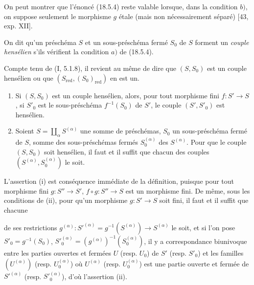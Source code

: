 \begin{remark}[18.5.4.4]
\label{IV.18.5.4.4}
On peut montrer que l'énoncé (18.5.4) reste valable lorsque, dans la condition $b)$, on suppose seulement le morphisme $g$ étale (mais non nécessairement séparé) [43, exp. XII].
\end{remark}

\begin{definition}[18.5.5]
\label{IV.18.5.5}
On dit qu'un préschéma $S$ et un sous-préschéma fermé $S_0$ de $S$ forment un \emph{couple hensélien} s'ils vérifient la condition $a)$ de (18.5.4).
\end{definition}

Compte tenu de (I, 5.1.8), il revient au même de dire que $(S,S_0)$ est un couple hensélien ou que $(S_{\mathrm{red}},(S_0)_{\mathrm{red}})$ en est un.

\begin{proposition}[18.5.6]
\label{IV.18.5.6}
\begin{enumerate}
  \item[(i)] Si $(S,S_0)$ est un couple hensélien, alors, pour tout morphisme fini $f:S'\to S$, si $S'_0$ est le sous-préschéma $f^{-1}(S_0)$ de $S'$, le couple $(S',S'_0)$ est hensélien.
  \item[(ii)] Soient $S=\coprod_\alpha S^{(\alpha)}$ une somme de préschémas, $S_0$ un sous-préschéma fermé de $S$, somme des sous-préschémas fermés $S_0^{(\alpha)}$ des $S^{(\alpha)}$. Pour que le couple $(S,S_0)$ soit hensélien, il faut et il suffit que chacun des couples $(S^{(\alpha)},S_0^{(\alpha)})$ le soit.
\end{enumerate}
\end{proposition}

L'assertion (i) est conséquence immédiate de la définition, puisque pour tout morphisme fini $g:S''\to S'$, $f\circ g:S''\to S$ est un morphisme fini. De même, sous les conditions de (ii), pour qu'un morphisme $g:S'\to S$ soit fini, il faut et il suffit que chacune


de ses restrictions $g^{(\alpha)}:S'^{(\alpha)}=g^{-1}(S^{(\alpha)})\to S^{(\alpha)}$ le soit, et si l'on pose $S'_0=g^{-1}(S_0)$, $S'^{(\alpha)}_0=(g^{(\alpha)})^{-1}(S^{(\alpha)}_0)$, il y a correspondance biunivoque entre les parties ouvertes et fermées $U$ (resp. $U_0$) de $S'$ (resp. $S'_0$) et les familles $(U^{(\alpha)})$ (resp. $U^{(\alpha)}_0$) où $U^{(\alpha)}$ (resp. $U^{(\alpha)}_0$) est une partie ouverte et fermée de $S'^{(\alpha)}$ (resp. $S'^{(\alpha)}_0$), d'où l'assertion (ii).

